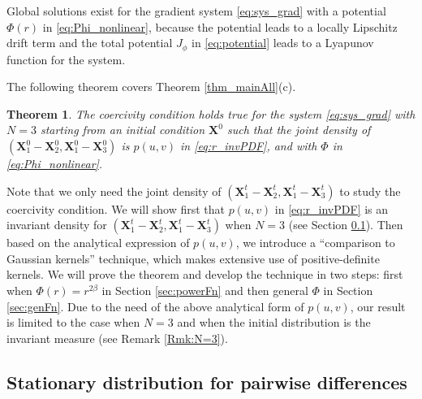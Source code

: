 \documentclass[]{elsarticle}
\def\R{\mathbb{R}}
\newcommand{\mbf}[1]{\boldsymbol{#1}}
\newcommand{\bX}{\mbf{X}}
\newtheorem{theorem}{Theorem}
\numberwithin{equation}{section}
\numberwithin{theorem}{section}
\begin{document}
Global solutions exist for the gradient system \eqref{eq:sys_grad} with a potential $\Phi(r)$ in \eqref{eq:Phi_nonlinear}, because the potential leads to a locally Lipschitz drift term and the total potential $J_\phi$ in \eqref{eq:potential} leads to a Lyapunov function for the system. %
 
 The following theorem covers Theorem \ref{thm_mainAll}(c). 
\begin{theorem}\label{Thm:cc_general} The coercivity condition holds true for the system \eqref{eq:sys_grad} with $N=3$ starting from an initial condition $\bX^0$ such that the joint density of $(\bX^0_1-\bX^0_2, \bX^0_1-\bX^0_3)$ is $p(u,v)$ in  \eqref{eq:r_invPDF}, and with $\Phi$ in  \eqref{eq:Phi_nonlinear}.  
\end{theorem}

Note that we only need the joint density of $(\bX^t_1-\bX^t_2, \bX^t_1-\bX^t_3)$ to study the coercivity condition. We will show first that  $p(u,v)$ in  \eqref{eq:r_invPDF} is an invariant density for $(\bX^t_1-\bX^t_2, \bX^t_1-\bX^t_3)$ when $N=3$ (see Section \ref{sec:stationary}).  Then based on the analytical expression of $p(u,v)$, we introduce a ``comparison to Gaussian kernels'' technique, which makes extensive use of positive-definite kernels. We will prove the theorem and develop the technique in two steps: first when $\Phi(r)=r^{2\beta}$ in Section \ref{sec:powerFn} and then general $\Phi$ in Section \ref{sec:genFn}. Due to the need of the above analytical form of $p(u,v)$, our result is limited to the case when $N=3$ and when the initial distribution is the invariant measure (see Remark \ref{Rmk:N=3}). 


\subsection{Stationary distribution for pairwise differences} \label{sec:stationary}
\end{document}
